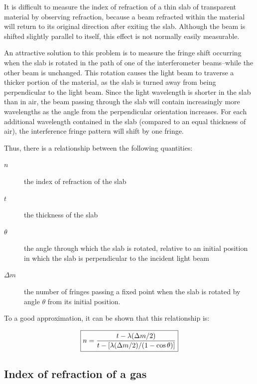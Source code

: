 It is difficult to measure the index of refraction of a thin slab of transparent
material by observing refraction, because a beam refracted within the material
will return to its original direction after exiting the slab. Although the beam is
shifted slightly parallel to itself, this effect is not normally easily
measurable. 

An attractive solution to this problem is to measure the fringe shift occurring
when the slab is rotated in the path of one of the interferometer beams--while
the other beam is unchanged.  This rotation causes the light beam to traverse a
thicker portion of the material, as the slab is turned away from being
perpendicular to the light beam. Since the light wavelength is shorter in the
slab than in air, the beam passing through the slab will contain
increasingly more wavelengths as the angle from the perpendicular orientation
increases. For each additional wavelength contained in the slab (compared to an
equal thickness of air), the interference fringe pattern will shift by one
fringe.

Thus, there is a relationship between the following quantities:
\begin{description}
\item[$n$]  the index of refraction of the slab
\item[$t$]  the thickness of the slab
\item[$\theta$]  the angle through which the slab is rotated, relative to an  initial position in which the slab is perpendicular to the  incident light beam
\item[$\Delta m$]  the number of fringes passing a fixed point when the slab 
is  rotated by angle \ensuremath{\theta} from its initial position.
\end{description}

To a good approximation, it can be shown that this relationship is: 

\begin{equation}
\boxed{ n = { t - \lambda ( \Delta m/2) \over t - \left[ \lambda ( \Delta
      m/2)/(1-\cos\theta) \right] } 
\label{eq:glassslide}}
\end{equation}

\subsection{Index of refraction of a gas}

